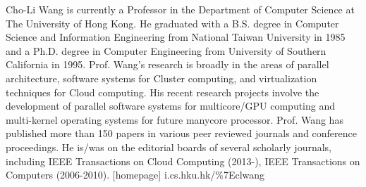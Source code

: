 \documentclass[10pt,journal,compsoc]{IEEEtran}
\begin{document}
\begin{IEEEbiography}{Cho-Li Wang}
is currently a Professor in the Department of Computer Science at The
University of Hong Kong. He graduated with a B.S. degree in Computer Science and
Information Engineering from National Taiwan University in 1985 and a Ph.D.
degree in Computer Engineering from University of Southern California in 1995. Prof.
Wang’s research is broadly in the areas of parallel architecture, software systems for
Cluster computing, and virtualization techniques for Cloud computing. His recent
research projects involve the development of parallel software systems for
multicore/GPU computing and multi-kernel operating systems for future manycore
processor. Prof. Wang has published more than 150 papers in various peer reviewed
journals and conference proceedings. He is/was on the editorial boards of several scholarly
journals, including IEEE Transactions on Cloud Computing (2013-), IEEE
Transactions on Computers (2006-2010).
[homepage] i.cs.hku.hk/\%7Eclwang
\end{IEEEbiography}









\end{document}
